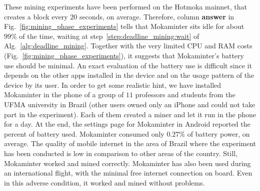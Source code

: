 These mining experiments have been performed on the Hotmoka mainnet, that creates a block every $20$ seconds,
on average. Therefore, column \textbf{answer} in Fig.~\ref{fig:mining_phase_experiments} tells that
Mokaminter sits idle for about $99\%$ of the time, waiting at step~\ref{step:deadline_mining:wait}
of Alg.~\ref{alg:deadline_mining}. Together with the very limited CPU and RAM costs
(Fig.~\ref{fig:mining_phase_experiments}), it suggests that Mokaminter's battery use should be minimal.
An exact evaluation of the battery use is difficult since it depends on the other apps
installed in the device and on the usage pattern of the device by its user.
In order to get some realistic hint, we have installed Mokaminter in the phone of
a group of $11$ professors and students from the UFMA university in Brazil
(other users owned only an iPhone and could not take part in the experiment).
Each of them created a miner and let it run in the phone for a day. At the end,
the settings page for Mokaminter in Android reported the percent of battery used.
Mokaminter consumed only $0.27\%$ of battery power, on average.
The quality of mobile internet in the area of Brazil where
the experiment has been conducted is low in comparison to other areas
of the country. Still, Mokaminter worked and mined correctly.
Mokaminter has also been used during
an international flight, with the minimal free internet connection
on board. Even in this adverse condition, it worked and mined without problems.


